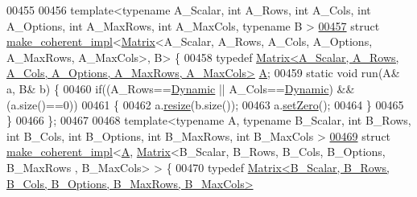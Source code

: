 \begin{DoxyCode}
00455 
00456 \textcolor{keyword}{template}<\textcolor{keyword}{typename} A\_Scalar, \textcolor{keywordtype}{int} A\_Rows, \textcolor{keywordtype}{int} A\_Cols, \textcolor{keywordtype}{int} A\_Options, \textcolor{keywordtype}{int} A\_MaxRows, \textcolor{keywordtype}{int} A\_MaxCols, \textcolor{keyword}{typename} B
      >
\hyperlink{struct_eigen_1_1internal_1_1make__coherent__impl_3_01_matrix_3_01_a___scalar_00_01_a___rows_00_0aa8f55819fa60ac5751cc2cbbaa58000}{00457} \textcolor{keyword}{struct }\hyperlink{struct_eigen_1_1internal_1_1make__coherent__impl}{make\_coherent\_impl}<\hyperlink{group___core___module_class_eigen_1_1_matrix}{Matrix}<A\_Scalar, A\_Rows, A\_Cols, A\_Options, A\_MaxRows, 
      A\_MaxCols>, B> \{
00458   \textcolor{keyword}{typedef} \hyperlink{group___core___module_class_eigen_1_1_matrix}{Matrix<A\_Scalar, A\_Rows, A\_Cols, A\_Options, A\_MaxRows, A\_MaxCols>}
       \hyperlink{group___core___module_class_eigen_1_1_matrix}{A};
00459   \textcolor{keyword}{static} \textcolor{keywordtype}{void} run(A& a, B& b) \{
00460     \textcolor{keywordflow}{if}((A\_Rows==\hyperlink{namespace_eigen_ad81fa7195215a0ce30017dfac309f0b2}{Dynamic} || A\_Cols==\hyperlink{namespace_eigen_ad81fa7195215a0ce30017dfac309f0b2}{Dynamic}) && (a.size()==0))
00461     \{
00462       a.\hyperlink{class_eigen_1_1_plain_object_base_a99d9054ee2d5a40c6e00ded0265e9cea}{resize}(b.size());
00463       a.\hyperlink{class_eigen_1_1_plain_object_base_ac21ad5f989f320e46958b75ac8d9a1da}{setZero}();
00464     \}
00465   \}
00466 \};
00467 
00468 \textcolor{keyword}{template}<\textcolor{keyword}{typename} A, \textcolor{keyword}{typename} B\_Scalar, \textcolor{keywordtype}{int} B\_Rows, \textcolor{keywordtype}{int} B\_Cols, \textcolor{keywordtype}{int} B\_Options, \textcolor{keywordtype}{int} B\_MaxRows, \textcolor{keywordtype}{int} B\_MaxCols
      >
\hyperlink{struct_eigen_1_1internal_1_1make__coherent__impl_3_01_a_00_01_matrix_3_01_b___scalar_00_01_b___r2332686f3180c2f2d848d1b5e8319450}{00469} \textcolor{keyword}{struct }\hyperlink{struct_eigen_1_1internal_1_1make__coherent__impl}{make\_coherent\_impl}<\hyperlink{group___core___module_class_eigen_1_1_matrix}{A}, \hyperlink{group___core___module_class_eigen_1_1_matrix}{Matrix}<B\_Scalar, B\_Rows, B\_Cols, B\_Options, B\_MaxRows
      , B\_MaxCols> > \{
00470   \textcolor{keyword}{typedef} \hyperlink{group___core___module_class_eigen_1_1_matrix}{Matrix<B\_Scalar, B\_Rows, B\_Cols, B\_Options, B\_MaxRows, B\_MaxCols>}

\end{DoxyCode}
